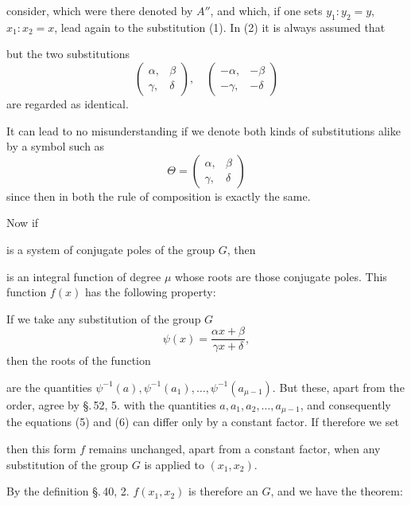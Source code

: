 consider, which were there denoted by $A''$, and which, if one sets
$y_1 : y_2 = y$, $x_1 : x_2 = x$, lead again to the substitution (1).
In (2) it is always assumed that


but the two substitutions
\[
\begin{pmatrix}\alpha, & \beta \\ \gamma, & \delta\end{pmatrix}, \quad
\begin{pmatrix}-\alpha, & -\beta \\ -\gamma, & -\delta\end{pmatrix}
\]
are regarded as identical.

It can lead to no misunderstanding if we denote both kinds
of substitutions alike by a symbol such as
\[
\Theta = \begin{pmatrix}\alpha, & \beta \\ \gamma, & \delta\end{pmatrix}
\]
since then in both the rule of composition is exactly
the same.

Now if


is a system of conjugate poles of the group $G$, then


is an integral function of degree $\mu$ whose roots are those conjugate
poles. This function $f(x)$ has the following property:

If we take any substitution of the group $G$
\[
\psi(x) = \frac{\alpha x + \beta}{\gamma x + \delta},
\]
then the roots of the function


are the quantities $\psi^{-1}(a), \psi^{-1}(a_1), \ldots, \psi^{-1}(a_{\mu-1})$. But these,
apart from the order, agree by \S.\,52, 5. with the
quantities $a, a_1, a_2, \ldots, a_{\mu-1}$, and consequently the
equations (5) and (6) can differ only by a constant factor.
If therefore we set


then this form $f$ remains unchanged, apart from a constant
factor, when any substitution of the group $G$ is applied
to $(x_1, x_2)$.

By the definition \S.\,40, 2. $f(x_1, x_2)$ is therefore an
 $G$, and we have the theorem:
